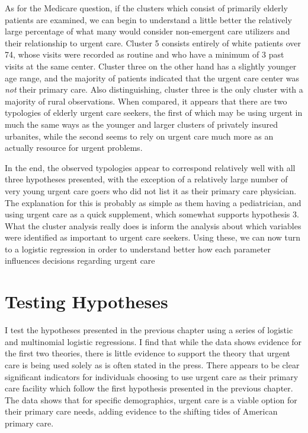\documentclass[12pt,twoside]{reedthesis}
\begin{document}
  As for the Medicare question, if the clusters which consist of primarily
  elderly patients are examined, we can begin to understand a little
  better the relatively large percentage of what many would consider
  non-emergent care utilizers and their relationship to urgent care.
  Cluster 5 consists entirely of white patients over 74, whose visits were
  recorded as routine and who have a minimum of 3 past visits at the same
  center. Cluster three on the other hand has a slightly younger age
  range, and the majority of patients indicated that the urgent care
  center was \emph{not} their primary care. Also distinguishing, cluster
  three is the only cluster with a majority of rural observations. When
  compared, it appears that there are two typologies of elderly urgent
  care seekers, the first of which may be using urgent in much the same
  ways as the younger and larger clusters of privately insured urbanites,
  while the second seems to rely on urgent care much more as an actually
  resource for urgent problems.
  
  In the end, the observed typologies appear to correspond relatively well
  with all three hypotheses presented, with the exception of a relatively
  large number of very young urgent care goers who did not list it as
  their primary care physician. The explanation for this is probably as
  simple as them having a pediatrician, and using urgent care as a quick
  supplement, which somewhat supports hypothesis 3. What the cluster
  analysis really does is inform the analysis about which variables were
  identified as important to urgent care seekers. Using these, we can now
  turn to a logistic regression in order to understand better how each
  parameter influences decisions regarding urgent care
  
  \section*{Testing Hypotheses}\label{testing-hypotheses}
  
  I test the hypotheses presented in the previous chapter using a series
  of logistic and multinomial logistic regressions. I find that while the
  data shows evidence for the first two theories, there is little evidence
  to support the theory that urgent care is being used solely as is often
  stated in the press. There appears to be clear significant indicators
  for individuals choosing to use urgent care as their primary care
  facility which follow the first hypothesis presented in the previous
  chapter. The data shows that for specific demographics, urgent care is a
  viable option for their primary care needs, adding evidence to the
  shifting tides of American primary care.
  
\end{document}
